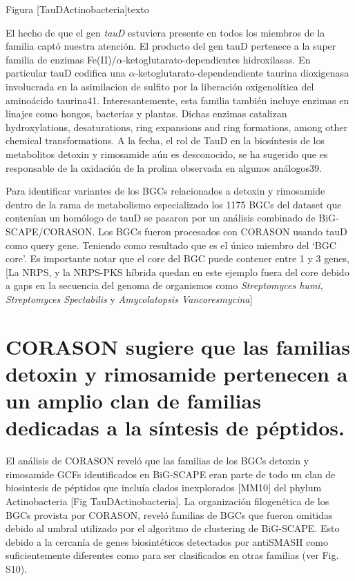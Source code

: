 \documentclass[12pt,twoside]{reedthesis}
\begin{document}
  Figura {[}TauDActinobacteria{]}texto
  
  El hecho de que el gen \emph{tauD} estuviera presente en todos los
  miembros de la familia captó nuestra atención. El producto del gen tauD
  pertenece a la super familia de enzimas
  Fe(II)/\(\alpha\)-ketoglutarato-dependientes hidroxilasas. En particular
  tauD codifica una \(\alpha\)-ketoglutarato-dependendiente taurina
  dioxigenasa involucrada en la asimilacion de sulfito por la liberación
  oxigenolítica del aminoácido taurina41. Interesantemente, esta familia
  también incluye enzimas en linajes como hongos, bacterias y plantas.
  Dichas enzimas catalizan hydroxylations, desaturations, ring expansions
  and ring formations, among other chemical transformations. A la fecha,
  el rol de TauD en la biosíntesis de los metabolitos detoxin y rimosamide
  aún es desconocido, se ha sugerido que es responsable de la oxidación de
  la prolina observada en algunos análogos39.
  
  Para identificar variantes de los BGCs relacionados a detoxin y
  rimosamide dentro de la rama de metabolismo especializado los 1175 BGCs
  del dataset que contenían un homólogo de tauD se pasaron por un análisis
  combinado de BiG-SCAPE/CORASON. Los BGCs fueron procesados con CORASON
  usando tauD como query gene. Teniendo como resultado que es el único
  miembro del `BGC core'. Es importante notar que el core del BGC puede
  contener entre 1 y 3 genes, {[}La NRPS, y la NRPS-PKS híbrida quedan en
  este ejemplo fuera del core debido a gaps en la secuencia del genoma de
  organismos como \emph{Streptomyces humi}, \emph{Streptomyces
  Spectabilis} y \emph{Amycolatopsis Vancoresmycina}{]}
  
  \section{CORASON sugiere que las familias detoxin y rimosamide
  pertenecen a un amplio clan de familias dedicadas a la síntesis de
  péptidos.}\label{corason-sugiere-que-las-familias-detoxin-y-rimosamide-pertenecen-a-un-amplio-clan-de-familias-dedicadas-a-la-sintesis-de-peptidos.}
  
  El análisis de CORASON reveló que las familias de los BGCs detoxin y
  rimosamide GCFs identificados en BiG-SCAPE eran parte de todo un clan de
  biosintesis de péptidos que incluía clados inexplorados {[}MM10{]} del
  phylum Actinobacteria {[}Fig TauDActinobacteria{]}. La organización
  filogenética de los BGCs provista por CORASON, reveló familias de BGCs
  que fueron omitidas debido al umbral utilizado por el algoritmo de
  clustering de BiG-SCAPE. Esto debido a la cercanía de genes
  biosintéticos detectados por antiSMASH como suficientemente diferentes
  como para ser clasificados en otras familias (ver Fig. S10).
  
\end{document}
